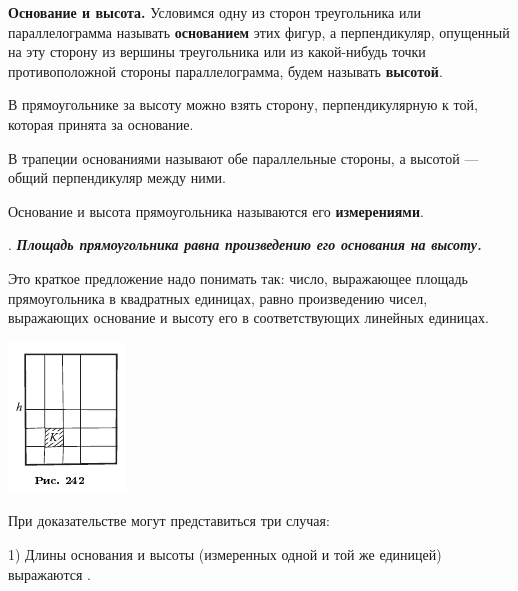 \documentclass[oneside]{book}
\begin{document}
\textbf{Основание и высота.}
Условимся одну из сторон треугольника или параллелограмма называть \textbf{основанием} этих фигур, а перпендикуляр, опущенный на эту сторону из вершины треугольника или из какой-нибудь точки противоположной стороны параллелограмма, будем называть \textbf{высотой}.

В прямоугольнике за высоту можно взять сторону, перпендикулярную к той, которая принята за основание.

В трапеции основаниями называют обе параллельные стороны, а высотой — общий перпендикуляр между ними.

Основание и высота прямоугольника называются его \textbf{измерениями}.

.
\textbf{\emph{Площадь прямоугольника равна произведению его основания на высоту.}}

Это краткое предложение надо понимать так:
число, выражающее площадь прямоугольника в квадратных единицах, равно произведению чисел, выражающих основание и высоту его в соответствующих линейных единицах.

\includegraphics{pics/ris-242}

При доказательстве могут представиться три случая:

1) Длины основания и высоты (измеренных одной и той же единицей) выражаются .
\end{document}
